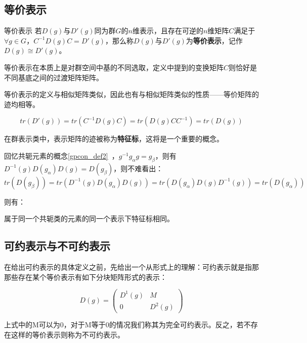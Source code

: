 


\subsection{等价表示}
\begin{definition}{等价表示}
若$D(g)$与$D'(g)$同为群$G$的$n$维表示，且存在可逆的$n$维矩阵$C$满足于$\forall g\in G$，$C^{-1}D(g)C=D'(g)$，那么称$D(g)$与$D'(g)$为\textbf{等价表示}，记作$D(g)\cong D'(g)$。
\end{definition}

等价表示在本质上是对群空间中基的不同选取，定义中提到的变换矩阵$C$则恰好是不同基底之间的过渡矩阵矩阵。

等价表示的定义与相似矩阵类似，因此也有与相似矩阵类似的性质——等价矩阵的迹均相等。

$$tr(D'(g))=tr(C^{-1}D(g)C)=tr(D(g)CC^{-1})=tr(D(g))$$

在群表示类中，表示矩阵的迹被称为\textbf{特征标}，这将是一个重要的概念。

回忆共轭元素的概念\autoref{gpcon_def2}~，$g^{-1}g_\alpha g=g_\beta$，则有$D^{-1}(g)D(g_\alpha)D(g)=D(g_\beta)$，则不难看出：
$$tr(D(g_\beta))=tr(D^{-1}(g)D(g_\alpha)D(g))=tr(D(g_\alpha)D(g)D^{-1}(g))=tr(D(g_\alpha))$$

则有：
\begin{corollary}{}
属于同一个共轭类的元素的同一个表示下特征标相同。
\end{corollary}



\subsection{可约表示与不可约表示}

在给出可约表示的具体定义之前，先给出一个从形式上的理解：可约表示就是指那那些存在某个等价表示有如下分块矩阵形式的表示：

\begin{equation}
D(g)=\begin{pmatrix}
 D^1(g) & M\\
 0 & D^2(g)
\end{pmatrix}
\end{equation}

上式中的M可以为0，对于M等于0的情况我们称其为完全可约表示。反之，若不存在这样的等价表示则称为不可约表示。

